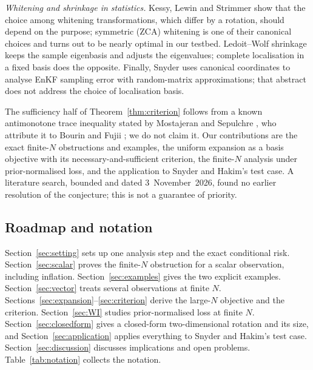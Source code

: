 \documentclass[11pt,a4paper]{article}
\numberwithin{equation}{section}
\theoremstyle{remark}\newtheorem{remark}[theorem]{Remark}
\begin{document}
\emph{Whitening and shrinkage in statistics.} Kessy, Lewin and Strimmer \cite{Kessy2018}
show that the choice among whitening transformations, which differ by a rotation, should
depend on the purpose; symmetric (ZCA) whitening is one of their canonical choices and
turns out to be nearly optimal in our testbed. Ledoit--Wolf shrinkage \cite{LedoitWolf2004}
keeps the sample eigenbasis and adjusts the eigenvalues; complete localisation in a fixed
basis does the opposite. Finally, Snyder \cite{Snyder2025} uses canonical coordinates to
analyse EnKF sampling error with random-matrix approximations; that abstract does not
address the choice of localisation basis.

The sufficiency half of Theorem~\ref{thm:criterion} follows from a known antimonotone trace
inequality stated by Mostajeran and Sepulchre \cite{MostajeranSepulchre2018}, who attribute it
to Bourin \cite{Bourin1999} and Fujii \cite{Fujii2005}; we do not claim it. Our contributions are the exact finite-\(N\)
obstructions and examples, the uniform expansion as a basis objective with its
necessary-and-sufficient criterion, the finite-\(N\) analysis under prior-normalised loss, and
the application to Snyder and Hakim's test case. A literature search, bounded and dated
3~November~2026, found no earlier resolution of the conjecture; this is not a guarantee of
priority.

\subsection{Roadmap and notation}

Section~\ref{sec:setting} sets up one analysis step and the exact conditional risk.
Section~\ref{sec:scalar} proves the finite-\(N\) obstruction for a scalar observation,
including inflation. Section~\ref{sec:examples} gives the two explicit examples.
Section~\ref{sec:vector} treats several observations at finite \(N\).
Sections~\ref{sec:expansion}--\ref{sec:criterion} derive the large-\(N\) objective and the
criterion. Section~\ref{sec:WI} studies prior-normalised loss at finite \(N\).
Section~\ref{sec:closedform} gives a closed-form two-dimensional rotation and its size, and
Section~\ref{sec:application} applies everything to Snyder and Hakim's test case.
Section~\ref{sec:discussion} discusses implications and open problems. Table~\ref{tab:notation}
collects the notation.
\end{document}
